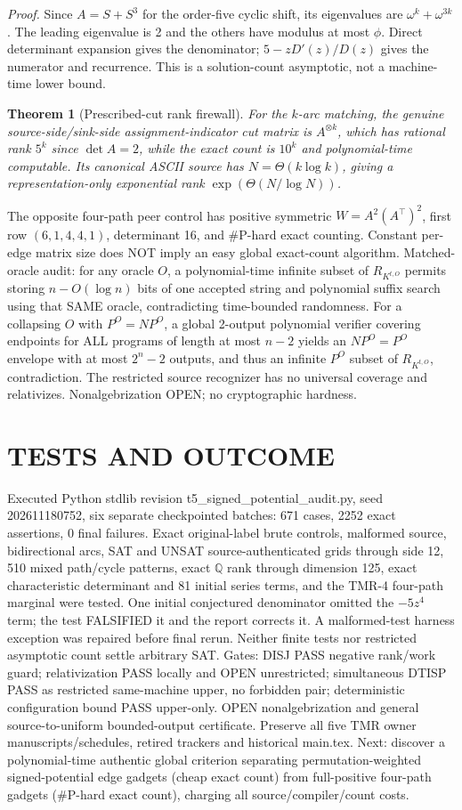\documentclass[11pt]{article}
\newtheorem{theorem}{Theorem}
\begin{document}
\noindent\emph{Proof.} Since $A=S+S^3$ for the order-five cyclic shift, its eigenvalues are $\omega^k+\omega^{3k}$. The leading eigenvalue is 2 and the others have modulus at most $\phi$. Direct determinant expansion gives the denominator; $5-zD'(z)/D(z)$ gives the numerator and recurrence. This is a solution-count asymptotic, not a machine-time lower bound.
\begin{theorem}[Prescribed-cut rank firewall]
For the $k$-arc matching, the genuine source-side/sink-side assignment-indicator cut matrix is $A^{\otimes k}$, which has rational rank $5^k$ since $\det A=2$, while the exact count is $10^k$ and polynomial-time computable. Its canonical ASCII source has $N=\Theta(k\log k)$, giving a representation-only exponential rank $\exp(\Theta(N/\log N))$.
\end{theorem}
The opposite four-path peer control has positive symmetric $W=A^2(A^\top)^2$, first row $(6,1,4,4,1)$, determinant 16, and \#P-hard exact counting. Constant per-edge matrix size does NOT imply an easy global exact-count algorithm.
Matched-oracle audit: for any oracle $O$, a polynomial-time infinite subset of $R_{K^{t,O}}$ permits storing $n-O(\log n)$ bits of one accepted string and polynomial suffix search using that SAME oracle, contradicting time-bounded randomness. For a collapsing $O$ with $P^O=NP^O$, a global 2-output polynomial verifier covering endpoints for ALL programs of length at most $n-2$ yields an $NP^O=P^O$ envelope with at most $2^n-2$ outputs, and thus an infinite $P^O$ subset of $R_{K^{t,O}}$, contradiction. The restricted source recognizer has no universal coverage and relativizes. Nonalgebrization OPEN; no cryptographic hardness.
\section{TESTS AND OUTCOME}
Executed Python stdlib revision t5_signed_potential_audit.py, seed 202611180752, six separate checkpointed batches: 671 cases, 2252 exact assertions, 0 final failures. Exact original-label brute controls, malformed source, bidirectional arcs, SAT and UNSAT source-authenticated grids through side 12, 510 mixed path/cycle patterns, exact $\mathbb Q$ rank through dimension 125, exact characteristic determinant and 81 initial series terms, and the TMR-4 four-path marginal were tested. One initial conjectured denominator omitted the $-5z^4$ term; the test FALSIFIED it and the report corrects it. A malformed-test harness exception was repaired before final rerun. Neither finite tests nor restricted asymptotic count settle arbitrary SAT.
Gates: DISJ PASS negative rank/work guard; relativization PASS locally and OPEN unrestricted; simultaneous DTISP PASS as restricted same-machine upper, no forbidden pair; deterministic configuration bound PASS upper-only. OPEN nonalgebrization and general source-to-uniform bounded-output certificate. Preserve all five TMR owner manuscripts/schedules, retired trackers and historical main.tex.
Next: discover a polynomial-time authentic global criterion separating permutation-weighted signed-potential edge gadgets (cheap exact count) from full-positive four-path gadgets (\#P-hard exact count), charging all source/compiler/count costs.
\end{document}
